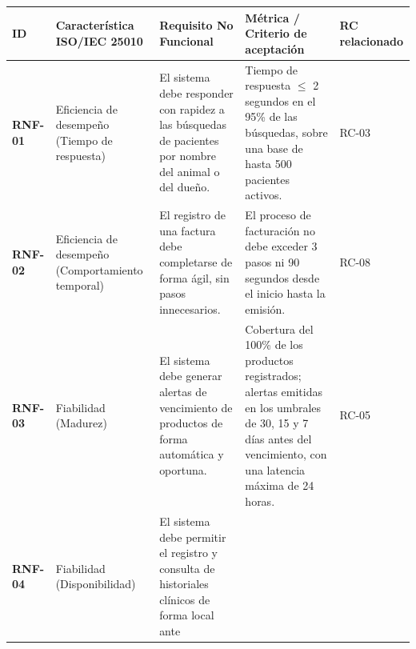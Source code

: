 {\def\LTcaptype{none} %
\begin{longtable}[]{@{}
  >{\raggedright\arraybackslash}p{}
  >{\raggedright\arraybackslash}p{}
  >{\raggedright\arraybackslash}p{}
  >{\raggedright\arraybackslash}p{}
  >{\raggedright\arraybackslash}p{}@{}}
\toprule\noalign{}
\begin{minipage}[b]{\linewidth}\raggedright
\textbf{ID}
\end{minipage} & \begin{minipage}[b]{\linewidth}\raggedright
\textbf{Característica ISO/IEC 25010}
\end{minipage} & \begin{minipage}[b]{\linewidth}\raggedright
\textbf{Requisito No Funcional}
\end{minipage} & \begin{minipage}[b]{\linewidth}\raggedright
\textbf{Métrica / Criterio de aceptación}
\end{minipage} & \begin{minipage}[b]{\linewidth}\raggedright
\textbf{RC relacionado}
\end{minipage} \\
\midrule\noalign{}
\endhead
\bottomrule\noalign{}
\endlastfoot
\textbf{RNF-01} & Eficiencia de desempeño (Tiempo de respuesta) & El
sistema debe responder con rapidez a las búsquedas de pacientes por
nombre del animal o del dueño. & Tiempo de respuesta $\leq$ 2 segundos en
el 95\% de las búsquedas, sobre una base de hasta 500 pacientes activos.
& RC-03 \\
\textbf{RNF-02} & Eficiencia de desempeño (Comportamiento temporal) & El
registro de una factura debe completarse de forma ágil, sin pasos
innecesarios. & El proceso de facturación no debe exceder 3 pasos ni 90
segundos desde el inicio hasta la emisión. & RC-08 \\
\textbf{RNF-03} & Fiabilidad (Madurez) & El sistema debe generar alertas
de vencimiento de productos de forma automática y oportuna. & Cobertura
del 100\% de los productos registrados; alertas emitidas en los umbrales
de 30, 15 y 7 días antes del vencimiento, con una latencia máxima de 24
horas. & RC-05 \\
\textbf{RNF-04} & Fiabilidad (Disponibilidad) & El sistema debe permitir
el registro y consulta de historiales clínicos de forma local ante

\end{longtable}}
